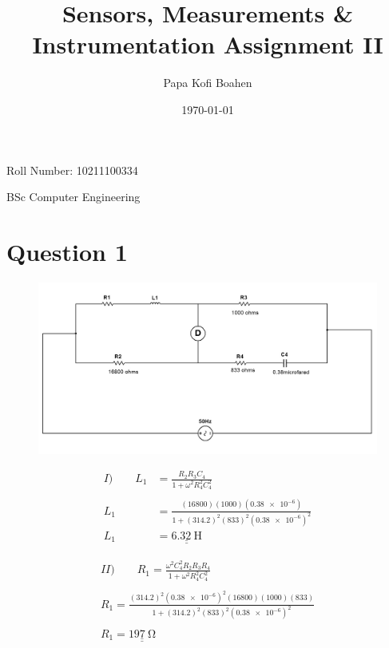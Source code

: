 \documentclass[12pt]{article}
\title{\huge{Sensors, Measurements \& Instrumentation Assignment II}}
\author{\huge{Papa Kofi Boahen}}
\date{\today}
\begin{document}
\maketitle
\huge{Roll Number: 10211100334} \par  BSc Computer Engineering
	
\section*{Question 1}
\begin{figure}[H]
	\includegraphics[width=\textwidth]{number1}
\end{figure}

\begin{align*}
	I) \qquad	
		L_{1} &= \frac{R_2R_3C_4}{1+\omega^2R_4^2C_4^2} \\
		\\
	L_{1} &= \frac{(16800)(1000)(\num{0.38e-6})} {1+(314.2)^2(833)^2 (\num{0.38e-6})^{2}} \\
	L_{1} &= \underline{\underline{\qty{6.32}{\henry}}}
\end{align*}

\vspace{2cm}

\begin{gather*}
	II) \qquad	
	R_{1} = \frac{\omega^2C_4^2R_2R_3R_4}{1+\omega^2R_4^2C_4^2} \\
	\\
	R_{1} = \frac{(314.2)^2(\num{0.38e-6})^2(16800)(1000)(833)} {1+(314.2)^2(833)^2 (\num{0.38e-6})^{2}} \\
	\\
	R_{1} = \underline{\underline{\qty{197}{\ohm}}}
\end{gather*}
\end{document}
